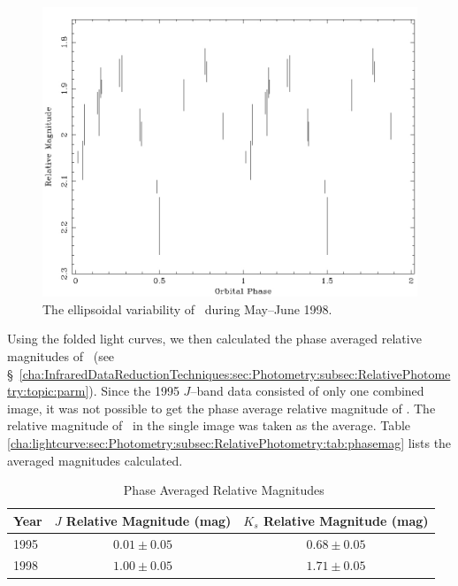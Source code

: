 \begin{figure}[!htb]
\begin{center}
\includegraphics[width=5.0in]{kctio98plot}
\caption{%
The ellipsoidal variability of \groj\ during May--June 1998. %
}
\label{cha:lightcurve:sec:Photometry:subsec:RelativePhotometry:fig:kctio98plot}
\end{center}
\end{figure}

\vspace{\myparskip}

Using the folded light curves, we then calculated the phase averaged relative magnitudes of \groj\ (see \S~\ref{cha:InfraredDataReductionTechniques:sec:Photometry:subsec:RelativePhotometry:topic:parm}). Since the 1995 $J$--band data consisted of only one combined image, it was not
possible to get the phase average relative magnitude of \groj. The
relative magnitude of \groj\ in the single image was taken as the
average. Table~%
\vref{cha:lightcurve:sec:Photometry:subsec:RelativePhotometry:tab:phasemag}
lists the averaged magnitudes calculated.

\begin{table}[htb]
\caption{\groj\ Phase Averaged Relative Magnitudes}
\label{cha:lightcurve:sec:Photometry:subsec:RelativePhotometry:tab:phasemag}

\begin{minipage}{\linewidth}
\renewcommand{\thefootnote}{\thempfootnote}

\begin{center}
\begin{tabular}{|l||||c|c|}

\hline
Year & $J$ Relative Magnitude (mag) & $K_s$ Relative Magnitude (mag) \\\hline\hline\hline\hline
1995 & $0.01\pm0.05$ & $0.68\pm0.05$ \\\hline
1998 & $1.00\pm0.05$ & $1.71\pm0.05$ \\\hline
\hline
\end{tabular}
\end{center}
\end{minipage}
\end{table}

